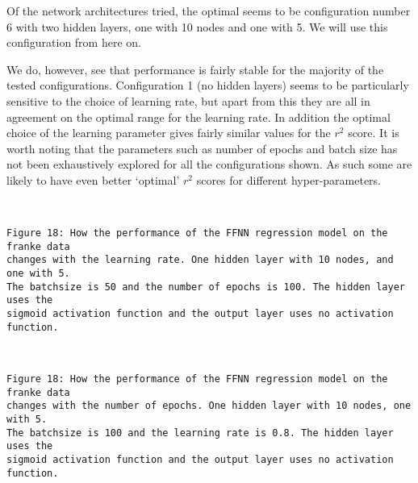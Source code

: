 \documentclass[11pt]{article}
\begin{document}
    Of the network architectures tried, the optimal seems to be
configuration number 6 with two hidden layers, one with 10 nodes and one
with 5. We will use this configuration from here on.

We do, however, see that performance is fairly stable for the majority
of the tested configurations. Configuration 1 (no hidden layers) seems to be
particularly sensitive to the choice of learning rate, but apart from
this they are all in agreement on the optimal range for the learning
rate. In addition the optimal choice of the learning parameter gives
fairly similar values for the \(r^2\) score. It is worth noting that the
parameters such as number of epochs and batch size has not been
exhaustively explored for all the configurations shown. As such some are
likely to have even better `optimal' \(r^2\) scores for different
hyper-parameters.

    \begin{center}
    \end{center}
    { \hspace*{\fill} \\}
   
    \begin{Verbatim}[commandchars=\\\{\}]
Figure 18: How the performance of the FFNN regression model on the franke data
changes with the learning rate. One hidden layer with 10 nodes, and one with 5. 
The batchsize is 50 and the number of epochs is 100. The hidden layer uses the 
sigmoid activation function and the output layer uses no activation function.
    \end{Verbatim}

    \begin{center}
    \end{center}
    { \hspace*{\fill} \\}
    
    \begin{Verbatim}[commandchars=\\\{\}]
Figure 18: How the performance of the FFNN regression model on the franke data
changes with the number of epochs. One hidden layer with 10 nodes, one with 5. 
The batchsize is 100 and the learning rate is 0.8. The hidden layer uses the 
sigmoid activation function and the output layer uses no activation function.
    \end{Verbatim}
\end{document}
